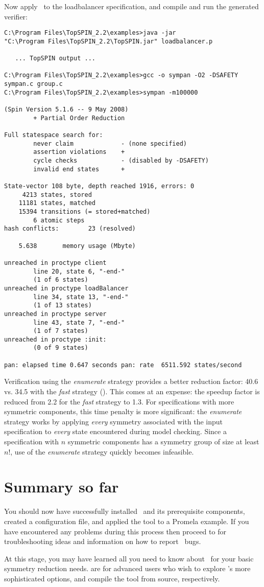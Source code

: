 Now apply \topspin\ to the loadbalancer specification, and compile
and run the generated verifier:
%
\begin{lstlisting}
C:\Program Files\TopSPIN_2.2\examples>java -jar
"C:\Program Files\TopSPIN_2.2\TopSPIN.jar" loadbalancer.p

   ... TopSPIN output ...

C:\Program Files\TopSPIN_2.2\examples>gcc -o sympan -O2 -DSAFETY sympan.c group.c
C:\Program Files\TopSPIN_2.2\examples>sympan -m100000

(Spin Version 5.1.6 -- 9 May 2008)
        + Partial Order Reduction

Full statespace search for:
        never claim             - (none specified)
        assertion violations    +
        cycle checks            - (disabled by -DSAFETY)
        invalid end states      +

State-vector 108 byte, depth reached 1916, errors: 0
     4213 states, stored
    11181 states, matched
    15394 transitions (= stored+matched)
        6 atomic steps
hash conflicts:        23 (resolved)

    5.638       memory usage (Mbyte)

unreached in proctype client
        line 20, state 6, "-end-"
        (1 of 6 states)
unreached in proctype loadBalancer
        line 34, state 13, "-end-"
        (1 of 13 states)
unreached in proctype server
        line 43, state 7, "-end-"
        (1 of 7 states)
unreached in proctype :init:
        (0 of 9 states)

pan: elapsed time 0.647 seconds pan: rate  6511.592 states/second
\end{lstlisting}
%
Verification using the \emph{enumerate} strategy provides a better
reduction factor: 40.6 vs. 34.5 with the \emph{fast} strategy
(). This comes at an expense: the speedup
factor is reduced from 2.2 for the \emph{fast} strategy to 1.3.  For
specifications with more symmetric components, this time penalty is
more significant: the \emph{enumerate} strategy works by applying
\emph{every} symmetry associated with the input specification to
\emph{every} state encountered during model checking.  Since a
specification with $n$ symmetric components has a symmetry group of
size at least $n!$, use of the \emph{enumerate} strategy quickly
becomes infeasible.

\section{Summary so far}
%
You should now have successfully installed \topspin\ and its
prerequisite components, created a configuration file, and applied
the tool to a Promela example.  If you have encountered any problems
during this process then proceed to  for
troubleshooting ideas and information on how to report \topspin\
bugs.

At this stage, you may have learned all you need to know about
\topspin\ for your basic symmetry reduction needs.
 are for advanced users who
wish to explore \topspin's more sophisticated options, and compile
the tool from source, respectively.
